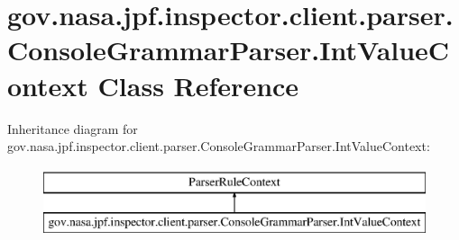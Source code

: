 \hypertarget{classgov_1_1nasa_1_1jpf_1_1inspector_1_1client_1_1parser_1_1_console_grammar_parser_1_1_int_value_context}{}\section{gov.\+nasa.\+jpf.\+inspector.\+client.\+parser.\+Console\+Grammar\+Parser.\+Int\+Value\+Context Class Reference}
\label{classgov_1_1nasa_1_1jpf_1_1inspector_1_1client_1_1parser_1_1_console_grammar_parser_1_1_int_value_context}
Inheritance diagram for gov.\+nasa.\+jpf.\+inspector.\+client.\+parser.\+Console\+Grammar\+Parser.\+Int\+Value\+Context\+:\begin{figure}[H]
\begin{center}
\leavevmode
\includegraphics[height=2.000000cm]{classgov_1_1nasa_1_1jpf_1_1inspector_1_1client_1_1parser_1_1_console_grammar_parser_1_1_int_value_context}
\end{center}
\end{figure}
